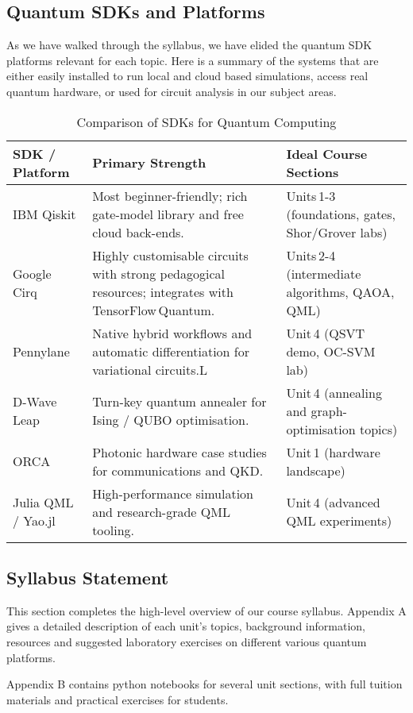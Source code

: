 \subsection{Quantum SDKs and Platforms}

As we have walked through the syllabus, we have elided the quantum SDK platforms relevant for each topic.
Here is a summary of the systems that are either easily installed to run local and cloud based simulations, 
access real quantum hardware, or used for circuit analysis in our subject areas.

\begin{table}[ht]
	\centering
	\begin{tabular}{|p{2.8cm}|p{7cm}|p{4cm}|}
		\hline
		\textbf{SDK / Platform} & \textbf{Primary Strength} & \textbf{Ideal Course Sections} \\
		\hline
		IBM Qiskit & Most beginner-friendly; rich gate-model library and free cloud back-ends. & Units\,1-3 (foundations, gates, Shor/Grover labs) \\
		\hline
		Google Cirq & Highly customisable circuits with strong pedagogical resources; integrates with TensorFlow\,Quantum. & Units\,2-4 (intermediate algorithms, QAOA, QML) \\
		\hline
		Pennylane & Native hybrid workflows and automatic differentiation for variational circuits.L & Unit\,4 (QSVT demo, OC-SVM lab) \\
		\hline
		D-Wave Leap & Turn-key quantum annealer for Ising / QUBO optimisation. & Unit\,4 (annealing and graph-optimisation topics) \\
		\hline
		ORCA  & Photonic hardware case studies for communications and QKD. & Unit\,1 (hardware landscape) \\
		\hline
		Julia QML / Yao.jl & High-performance simulation and research-grade QML tooling. & Unit\,4 (advanced QML experiments) \\
		\hline
	\end{tabular}
	\vspace{4pt}
	\caption{Comparison of SDKs for Quantum Computing}
	\label{tab:quantum_sdk_comparison}
\end{table}

\subsection{Syllabus Statement}

This section completes the high-level overview of our course syllabus. 
Appendix A gives a detailed description of each unit's topics, background information, resources 
and suggested laboratory exercises on different various quantum platforms.  

Appendix B contains python notebooks for several unit sections, with full tuition materials 
and practical exercises for students. 